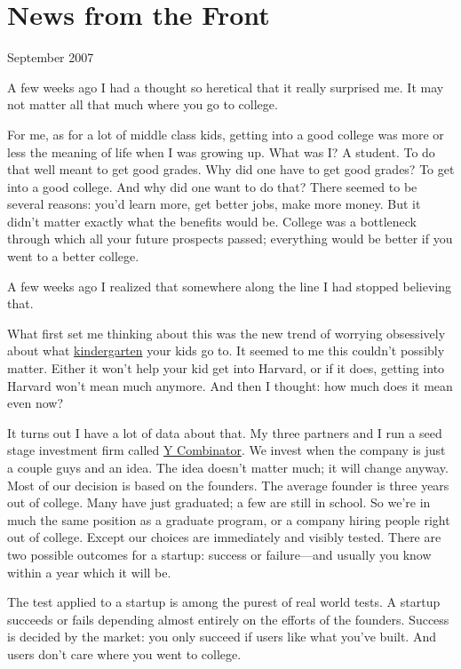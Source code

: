 \chapter{News from the Front}

September 2007

A few weeks ago I had a thought so heretical that it really surprised
me. It may not matter all that much where you go to college.

For me, as for a lot of middle class kids, getting into a good college
was more or less the meaning of life when I was growing up. What was I?
A student. To do that well meant to get good grades. Why did one have to
get good grades? To get into a good college. And why did one want to do
that? There seemed to be several reasons: you'd learn more, get better
jobs, make more money. But it didn't matter exactly what the benefits
would be. College was a bottleneck through which all your future
prospects passed; everything would be better if you went to a better
college.

A few weeks ago I realized that somewhere along the line I had stopped
believing that.

What first set me thinking about this was the new trend of worrying
obsessively about what
\href{http://nymag.com/nymetro/urban/education/features/15141/}{kindergarten}
your kids go to. It seemed to me this couldn't possibly matter. Either
it won't help your kid get into Harvard, or if it does, getting into
Harvard won't mean much anymore. And then I thought: how much does it
mean even now?

It turns out I have a lot of data about that. My three partners and I
run a seed stage investment firm called \href{http://ycombinator.com}{Y
Combinator}. We invest when the company is just a couple guys and an
idea. The idea doesn't matter much; it will change anyway. Most of our
decision is based on the founders. The average founder is three years
out of college. Many have just graduated; a few are still in school. So
we're in much the same position as a graduate program, or a company
hiring people right out of college. Except our choices are immediately
and visibly tested. There are two possible outcomes for a startup:
success or failure---and usually you know within a year which it will
be.

The test applied to a startup is among the purest of real world tests. A
startup succeeds or fails depending almost entirely on the efforts of
the founders. Success is decided by the market: you only succeed if
users like what you've built. And users don't care where you went to
college.

